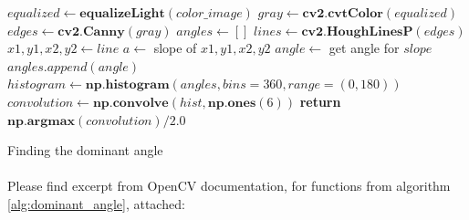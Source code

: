 \begin{algorithm}
	\begin{spacing}{1.5}
	\begin{algorithmic}[1]
			\State $equalized \gets \textbf{equalizeLight}(color\_image)$
			\State $gray \gets \textbf{cv2.cvtColor}(equalized)$
			\State $edges \gets \textbf{cv2.Canny}(gray)$
			\State $angles \gets []$
			\State $lines \gets \textbf{cv2.HoughLinesP}(edges)$
				\State $x1, y1, x2, y2 \gets line$
				\State $a \gets $ slope of $x1, y1, x2, y2$
				\State $angle \gets$ get angle for $slope$
				\State $angles.append(angle)$
			\EndFor
			\State $histogram \gets \textbf{np.histogram}(angles, bins=360, range=(0, 180))$
			\State $convolution \gets \textbf{np.convolve}(hist, \textbf{np.ones}(6))$
			\State \textbf{return} $\textbf{np.argmax}(convolution) / 2.0$
		\EndFunction
	\end{algorithmic}
	\end{spacing}
	\caption{Finding the dominant angle}
	\label{alg:dominant_angle}
\end{algorithm}

\paragraph{}
Please find excerpt from OpenCV documentation, for functions from algorithm \ref{alg:dominant_angle}, attached: \cite{opencv-docs}

